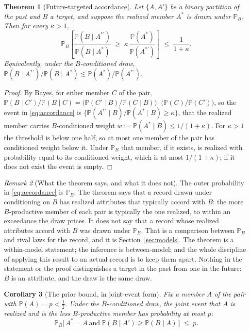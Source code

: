 \documentclass[11pt]{article}
\newcommand{\PP}{\mathbb{P}}
\theoremstyle{plain}
\newtheorem{theorem}{Theorem}[section]
\newtheorem{corollary}[theorem]{Corollary}
\theoremstyle{definition}
\theoremstyle{remark}
\newtheorem{remark}[theorem]{Remark}
\begin{document}
\begin{theorem}[Future-targeted accordance]\label{thm:accordance}
Let $\{A,A'\}$ be a binary partition of the past and $B$ a target, and
suppose the realized member $A^\ast$ is drawn under $\PP_B$. Then for every
$\kappa>1$,
\begin{equation}\label{eq:accordance}
\PP_B\!\left[\frac{\PP(B\mid A^{\ast\prime})}{\PP(B\mid A^\ast)}
\;\ge\;\kappa\,\frac{\PP(A^\ast)}{\PP(A^{\ast\prime})}\right]
\;\le\;\frac{1}{1+\kappa}.
\end{equation}
Equivalently, under the $B$-conditioned draw,
$\PP(B\mid A^{\ast\prime})/\PP(B\mid A^\ast)\lesssim\PP(A^\ast)/\PP(A^{\ast\prime})$.
\end{theorem}

\begin{proof}
By Bayes, for either member $C$ of the pair,
$\PP(B\mid C')/\PP(B\mid C)=\bigl(\PP(C'\mid B)/\PP(C\mid B)\bigr)\cdot
\bigl(\PP(C)/\PP(C')\bigr)$, so the event in \eqref{eq:accordance} is
$\{\PP(A^{\ast\prime}\mid B)/\PP(A^\ast\mid B)\ge\kappa\}$, that the
realized member carries $B$-conditioned weight $w:=\PP(A^\ast\mid B)\le
1/(1+\kappa)$. For $\kappa>1$ the threshold is below one half, so at most
one member of the pair has conditioned weight below it. Under $\PP_B$ that
member, if it exists, is realized with probability equal to its
conditioned weight, which is at most $1/(1+\kappa)$; if it does not exist
the event is empty.
\end{proof}

\begin{remark}[What the theorem says, and what it does not]
\label{rem:scope}
The outer probability in \eqref{eq:accordance} is $\PP_B$. The theorem
says that a record drawn under conditioning on $B$ has realized
attributes that typically accord with $B$: the more $B$-productive member
of each pair is typically the one realized, to within an exceedance the
draw prices. It does not say that a record whose realized attributes
accord with $B$ was drawn under $\PP_B$. That is a comparison between
$\PP_B$ and rival laws for the record, and it is Section~\ref{sec:models}.
The theorem is a within-model statement; the inference is between-model;
and the whole discipline of applying this result to an actual record is
to keep them apart. Nothing in the statement or the proof distinguishes a
target in the past from one in the future: $B$ is an attribute, and the
draw is the same draw.
\end{remark}

\begin{corollary}[The prior bound, in joint-event form]\label{cor:prior}
Fix a member $A$ of the pair with $\PP(A)=p<\tfrac12$. Under the
$B$-conditioned draw, the joint event that $A$ is realized and is the
less $B$-productive member has probability at most $p$:
\begin{equation}\label{eq:prior}
\PP_B\bigl[\,A^\ast=A\ \text{and}\ \PP(B\mid A')\ge\PP(B\mid A)\,\bigr]\;\le\;p.
\end{equation}
\end{corollary}
\end{document}
